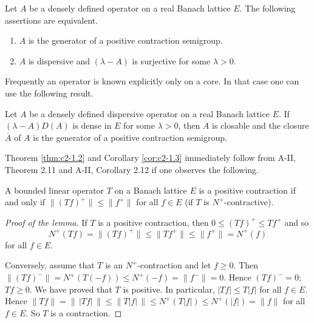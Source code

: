 \citet{phillips:1962}
\begin{theorem}\label{thm:c2-1.2}
%
%
%
Let $A$ be a densely defined operator on a real Banach lattice $E$. 
The following assertions are equivalent.
\begin{enumerate}[\upshape (a)]
\item \label{thm:c2-1.2-1}
$A$ is the generator of a positive contraction semigroup.
\item \label{thm:c2-1.2-2}
$A$ is dispersive and $(\lambda-A)$ is surjective for some $\lambda > 0$.
\end{enumerate}
\end{theorem}
Frequently an operator is known explicitly only on a core. In that case one can use the following result.
\begin{corollary}\label{cor:c2-1.3}
%
%
Let $A$ be a densely defined dispersive operator on a real Banach lattice $E$. 
If $(\lambda - A)D(A)$ is dense in $E$ for some $\lambda > 0$, then $A$ is closable and the closure $\overline{A}$ of $A$ is the generator of a positive contraction semigroup.
\end{corollary}
Theorem \ref{thm:c2-1.2}  and Corollary \ref{cor:c2-1.3}  immediately follow from A-II, Theorem 2.11 and A-II, Corollary 2.12  if one observes the following.
\begin{lemma}\label{lem:c2-1.4}
%
%
A bounded linear operator  $T$ on a Banach lattice $E$ is a positive contraction if and only if $\|(Tf)^{+}\| \leq \|f^{+}\|$ for all $f \in E$ (\ie if $T$ is $N^{+}$-contractive).
\end{lemma}
\begin{proof}[Proof of the lemma]
If $T$ is a positive contraction, then $0 \leq (Tf)^{+} \leq Tf^{+}$ and so 
%
\[
	N^{+}(Tf) = \|(Tf)^{+}\| \leq \|Tf^{+}\| \leq \|f^{+}\| = N^{+}(f)
\]
%
for all $f \in E$. 

Conversely, assume that $T$ is an $N^{+}$-contraction and let $f \geq 0$. 
Then $\|(Tf)^{-}\| = N^{+}(T(-f)) \leq N^{+}(-f) = \|f^{-}\| = 0$. 
Hence $(Tf)^{-} = 0$; \ie $Tf \geq 0$. 
We have proved that $T$ is positive. 
In particular, $|Tf| \leq T|f|$ for all $f \in E$. 
Hence $\|Tf\| = \|\,|Tf|\,\| \leq \|T|f|\,\| \leq N^{+}(T|f|) \leq N^{+}(|f|) = \|f\|$ for all $f \in E$. 
So $T$ is a contraction.
\end{proof}
